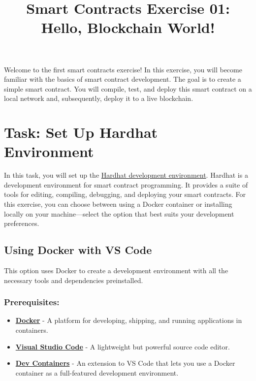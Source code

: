 \documentclass[12pt]{article}
\title{Smart Contracts Exercise 01: \\ Hello, Blockchain World!}
\author{}
\date{}
\begin{document}
\maketitle
\noindent
Welcome to the first smart contracts exercise! In this exercise, you will become familiar with the basics of smart contract development. The goal is to create a simple smart contract. You will compile, test, and deploy this smart contract on a local network and, subsequently, deploy it to a live blockchain.

\section{Task: Set Up Hardhat Environment}

In this task, you will set up the \href{https://hardhat.org}{Hardhat development environment}. Hardhat is a
development environment for smart contract programming. It provides a suite of tools for
editing, compiling, debugging, and deploying your smart contracts. For this
exercise, you can choose between using a Docker container or installing locally
on your machine—select the option that best suits your development
preferences.

\subsection{Using Docker with VS Code}

This option uses Docker to create a development environment with all the
necessary tools and dependencies preinstalled.

\subsubsection*{Prerequisites:}
\begin{itemize}
    \item \textbf{\href{https://www.docker.com/products/docker-desktop}{Docker}} - A platform for developing, shipping, and running applications in containers.
    \item \textbf{\href{https://code.visualstudio.com/}{Visual Studio Code}} - A lightweight but powerful source code editor.
    \item \textbf{\href{https://marketplace.visualstudio.com/items?itemName=ms-vscode-remote.remote-containers}{Dev Containers}} - An extension to VS Code that lets you use a Docker container as a full-featured development environment.
\end{itemize}
\end{document}
